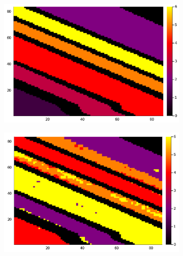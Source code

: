 \documentclass[a4paper, 10pt]{article}
\begin{document}
\begin{figure}[ht]
      \centering
      \begin{subfigure}[b]{0.24\textwidth}
            \centering
            \includegraphics[width=\linewidth]{salinasgt.png}
            \caption{}
            \label{fig:salinasgt}
      \end{subfigure}
      \begin{subfigure}[b]{0.24\textwidth}
            \centering
            \includegraphics[width=\linewidth]{risodata.png}
            \caption{}
            \label{fig:salinasr}
      \end{subfigure}
      \centering
      \begin{subfigure}[b]{0.24\textwidth}
            \centering

\end{subfigure}
\end{figure}
\end{document}

